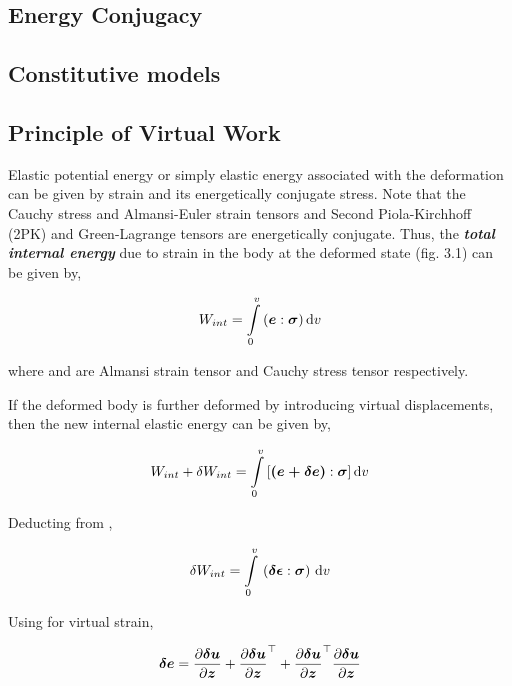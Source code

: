 \subsection{Energy Conjugacy}



\subsection{Constitutive models}



\subsection{Principle of Virtual Work}
Elastic potential energy or simply elastic energy associated with the
deformation can be given by strain and its energetically conjugate stress.
Note that the Cauchy stress and Almansi-Euler strain tensors and Second
Piola-Kirchhoff (2PK) and Green-Lagrange tensors are energetically
conjugate. Thus, the \textit{\textbf{total internal energy}} due to strain in
the body at the deformed state (fig. 3.1) can be given by,
 
\begin{equation}
  W_{int}=\gint{0}{v}{(\vect{e}:\vect{\sigma})}v
  \label{eqn:totalenergy}
\end{equation}

where  and \vect{\sigma} are Almansi strain tensor and Cauchy stress
tensor respectively.

If the deformed body is further deformed by introducing virtual displacements,
then the new internal elastic energy can be given by,

\begin{equation}
  {W_{int}+\delta W_{int}}=\gint{0}{v}{[\vect{(e+\delta{e})}:\vect{\sigma}]}v
  \label{eqn:virtualtotalenergy}
\end{equation}

Deducting  from ,

\begin{equation}
  \delta W_{int}=\gint{0}{v}{\pbrac{\vect{\delta \epsilon} : \vect{\sigma}}}v
  \label{eqn:virtualenergy}
\end{equation}

Using  for virtual strain,

\begin{equation}
  \vect{\delta e}=\delby{\vect{\delta u}}{\vect{z}} + \transpose{\delby{\vect{\delta u}}{\vect{z}}} + 
                  \transpose{\delby{\vect{\delta u}}{\vect{z}}}\delby{\vect{\delta u}}{\vect{z}}
  \label{eqn:virtualalmansidisplacement}
\end{equation}

